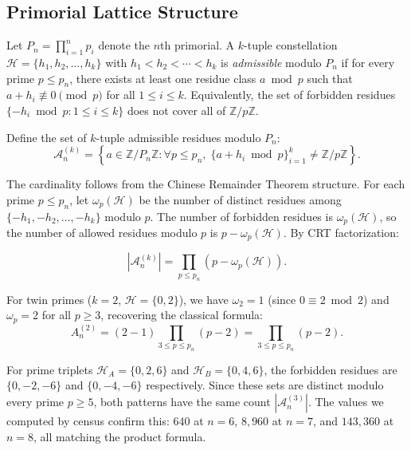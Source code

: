 \documentclass[11pt]{article}
\theoremstyle{remark}
\begin{document}
\subsection{Primorial Lattice Structure}

Let $P_n = \prod_{i=1}^n p_i$ denote the $n$th primorial. A $k$-tuple
constellation $\mathcal{H} = \{h_1, h_2, \ldots, h_k\}$ with
$h_1 < h_2 < \cdots < h_k$ is \emph{admissible} modulo $P_n$ if for
every prime $p \leq p_n$, there exists at least one residue class
$a \bmod p$ such that $a + h_i \not\equiv 0 \pmod{p}$ for all
$1 \leq i \leq k$. Equivalently, the set of forbidden residues
$\{-h_i \bmod p : 1 \leq i \leq k\}$ does not cover all of
$\mathbb{Z}/p\mathbb{Z}$.

Define the set of $k$-tuple admissible residues modulo $P_n$:
\begin{equation}
\mathcal{A}_n^{(k)} = \left\{ a \in \mathbb{Z}/P_n\mathbb{Z} :
\forall p \leq p_n, \; \{a + h_i \bmod p\}_{i=1}^k \neq \mathbb{Z}/p\mathbb{Z}
\right\}.
\end{equation}

The cardinality follows from the Chinese Remainder Theorem structure.
For each prime $p \leq p_n$, let $\omega_p(\mathcal{H})$ be the number
of distinct residues among $\{-h_1, -h_2, \ldots, -h_k\}$ modulo $p$.
The number of forbidden residues is $\omega_p(\mathcal{H})$, so the
number of allowed residues modulo $p$ is $p - \omega_p(\mathcal{H})$.
By CRT factorization:

\begin{equation}
\left|\mathcal{A}_n^{(k)}\right| = \prod_{p \leq p_n}
\left(p - \omega_p(\mathcal{H})\right).
\label{eq:adm-count}
\end{equation}

For twin primes ($k=2$, $\mathcal{H} = \{0, 2\}$), we have
$\omega_2 = 1$ (since $0 \equiv 2 \bmod 2$) and $\omega_p = 2$
for all $p \geq 3$, recovering the classical formula:
\begin{equation}
A_n^{(2)} = (2 - 1) \prod_{3 \leq p \leq p_n} (p - 2)
= \prod_{3 \leq p \leq p_n} (p - 2).
\end{equation}

For prime triplets $\mathcal{H}_A = \{0, 2, 6\}$ and
$\mathcal{H}_B = \{0, 4, 6\}$, the forbidden residues are
$\{0, -2, -6\}$ and $\{0, -4, -6\}$ respectively. Since these sets
are distinct modulo every prime $p \geq 5$, both patterns have the
same count $\left|\mathcal{A}_n^{(3)}\right|$. The values we computed
by census confirm this: $640$ at $n=6$, $8{,}960$ at $n=7$, and
$143{,}360$ at $n=8$, all matching the product formula.
\end{document}
